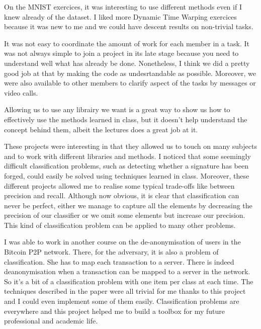 \documentclass{homework}
\begin{document}
On the MNIST exercices, it was interesting to use different methods even if I knew already of the dataset. I liked more Dynamic Time Warping exercices because it was new to me and we could have descent results on non-trivial tasks. 

It was not easy to coordinate the amount of work for each member in a task. It was not always simple to join a project in its late stage because you need to understand well what has already be done. Nonetheless, I think we did a pretty good job at that by making the code as undesrtandable as possible. Moreover, we were also available to other members to clarify aspect of the tasks by messages or video calls.

Allowing us to use any librairy we want is a great way to show us how to effectively use the methods learned in class, but it doesn't help understand the concept behind them, albeit the lectures does a great job at it.

These projects were interesting in that they allowed us to touch on many subjects and to work with different libraries and methods. I noticed that some seemingly difficult classification problems, such as detecting whether a signature has been forged, could easily be solved using techniques learned in class. Moreover, these different projects allowed me to realise some typical trade-offs like between precision and recall. Although now obvious, it is clear that classification can never be perfect, either we manage to capture all the elements by decreasing the precision of our classifier or we omit some elements but increase our precision. This kind of classification problem can be applied to many other problems.

I was able to work in another course on the de-anonymisation of users in the Bitcoin P2P network. There, for the adversary, it is also a problem of classification. She has to map each transaction to a server. There is indeed deanonymisation when a transaction can be mapped to a server in the network. So it's a bit of a classification problem with one item per class at each time. The techniques described in the paper were all trivial for me thanks to this project and I could even implement some of them easily. Classification problems are everywhere and this project helped me to build a toolbox for my future professional and academic life.
\end{document}
